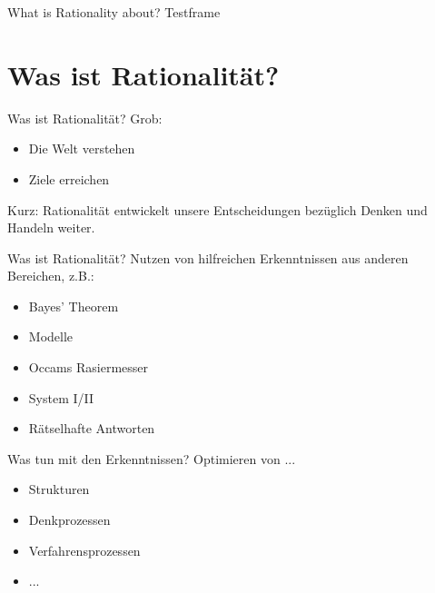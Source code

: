 \ifEnglish


\begin{frame}[c]{What is Rationality about?}
    Testframe
\end{frame}



\else

\section{Was ist Rationalität?}

\begin{frame}[c]{Was ist Rationalität?}
    \Large
    Grob:
    \newline
    \begin{itemize}
    \pause
    \item Die Welt verstehen    
    \newline
    \pause
    \pause
    \item Ziele erreichen       
    \newline
    \end{itemize}
    \pause
    \pause
    Kurz: Rationalität entwickelt unsere Entscheidungen bezüglich Denken und Handeln weiter.
\end{frame}


\begin{frame}[c]{Was ist Rationalität?}
    \Large
    Nutzen von hilfreichen Erkenntnissen aus anderen Bereichen, z.B.:
    \begin{itemize}
    \pause
    \item Bayes' Theorem        
    \pause
    \pause
    \item Modelle               
    \pause
    \pause
    \item Occams Rasiermesser   
    \pause
    \pause
    \item System I/II           
    \pause
    \pause
    \item Rätselhafte Antworten 
    \end{itemize}
\end{frame}


\begin{frame}[c]{Was tun mit den Erkenntnissen?}
    \Large
    \pause
    Optimieren von ...
    \begin{itemize}
    \pause
    \item Strukturen
    \pause
    \item Denkprozessen
    \pause
    \item Verfahrensprozessen
    \pause
    \item ...
    \end{itemize}
\end{frame}





\fi
